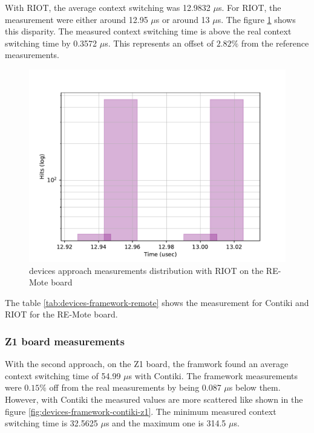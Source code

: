 With RIOT, the average context switching was 12.9832 $\mu$s.
For RIOT, the measurement were either around 12.95 $\mu$s or around 13 $\mu$s.
The figure \ref{fig:devices-framework-riot-remote} shows this disparity.
The measured context switching time is above the real context switching time by 0.3572 $\mu$s.
This represents an offset of $2.82\%$ from the reference measurements.

\begin{figure}[!ht]
      \centering
      \includegraphics[scale=.7]{assets/devices-framework-riot-remote.pdf}
      \caption{devices approach measurements distribution with RIOT on the RE-Mote board\label{fig:devices-framework-riot-remote}}
\end{figure}

The table \ref{tab:devices-framework-remote} shows the measurement for Contiki and RIOT for the RE-Mote board.



\subsubsection{Z1 board measurements}
With the second approach, on the Z1 board, the framwork found an average context switching time of 54.99 $\mu$s with Contiki.
The framework measurements were $0.15\%$ off from the real measurements by being 0.087 $\mu$s below them.
However, with Contiki the measured values are more scattered like shown in the figure \ref{fig:devices-framework-contiki-z1}.
The minimum measured context switching time is 32.5625 $\mu$s and the maximum one is 314.5 $\mu$s.

